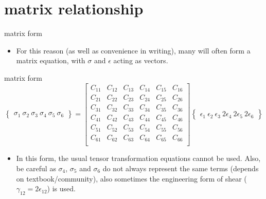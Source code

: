 \documentclass[
  letterpaper,
  ignorenonframetext,
  aspectratio=43,
  handout,
  12pt]{beamer}
\providecommand{\tightlist}{%
  \setlength{\itemsep}{0pt}\setlength{\parskip}{0pt}}
\providecommand{\tightlist}{%
\setlength{\itemsep}{0pt}\setlength{\parskip}{0pt}}
\begin{document}
\hypertarget{matrix-relationship}{%
\section{matrix relationship}\label{matrix-relationship}}

\begin{frame}{matrix form}
\protect\hypertarget{matrix-form}{}
\begin{itemize}
\tightlist
\item
  For this reason (as well as convenience in writing), many will often
  form a matrix equation, with \(\sigma\) and \(\epsilon\) acting as
  vectors.
\end{itemize}
\end{frame}

\begin{frame}{matrix form}
\protect\hypertarget{matrix-form-1}{}
\[\begin{Bmatrix}
    \sigma_1 \ \sigma_2 \ \sigma_3 \ \sigma_4 \ \sigma_5 \ \sigma_6
    \end{Bmatrix} = \begin{bmatrix}
    C_{11} & C_{12} & C_{13} & C_{14} & C_{15} & C_{16}\\
    C_{21} & C_{22} & C_{23} & C_{24} & C_{25} & C_{26}\\
    C_{31} & C_{32} & C_{33} & C_{34} & C_{35} & C_{36}\\
    C_{41} & C_{42} & C_{43} & C_{44} & C_{45} & C_{46}\\
    C_{51} & C_{52} & C_{53} & C_{54} & C_{55} & C_{56}\\
    C_{61} & C_{62} & C_{63} & C_{64} & C_{65} & C_{66}\\
    \end{bmatrix} \begin{Bmatrix}
    \epsilon_1 \ \epsilon_2 \ \epsilon_3 \ 2\epsilon_4 \ 2\epsilon_5 \ 2\epsilon_6
\end{Bmatrix}\]

\begin{itemize}
\tightlist
\item
  In this form, the usual tensor transformation equations cannot be
  used. Also, be careful as \(\sigma_4\), \(\sigma_5\) and \(\sigma_6\)
  do not always represent the same terms (depends on
  textbook/community), also sometimes the engineering form of shear
  (\(\gamma_{12} = 2\epsilon_{12}\)) is used.
\end{itemize}
\end{frame}
\end{document}
